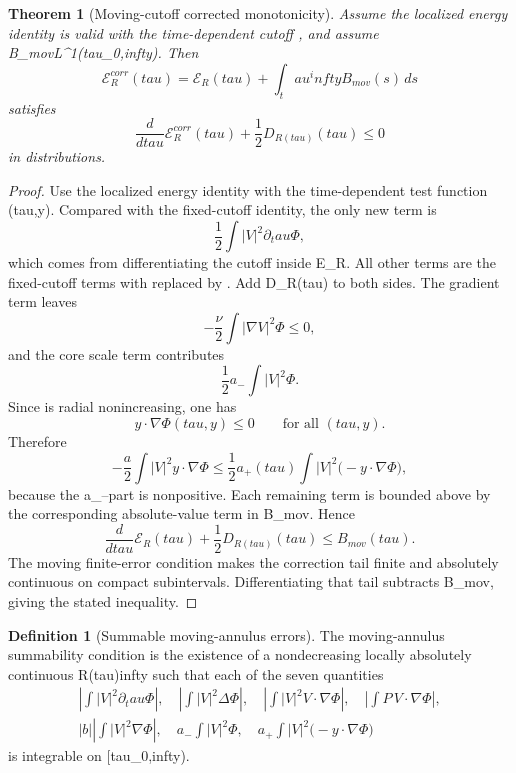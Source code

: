 \documentclass[11pt]{amsart}
\def\({}%
\def\){}%
\def\tilde#1{#1}%
\def\mathfrak#1{#1}%
\def\mathrm#1{#1}%
\def\tau{tau}%
\def\infty{infty}%
\theoremstyle{plain}
\newtheorem{theorem}{Theorem}[section]
\theoremstyle{definition}
\newtheorem{definition}[definition]{Definition}
\theoremstyle{remark}
\begin{document}
\begin{theorem}[Moving-cutoff corrected monotonicity]
\label{paper6a:thm:moving-corrected-monotonicity}
Assume the localized energy identity is valid with the time-dependent cutoff
\(\Phi\), and assume \(B_{\mathrm{mov}}\in L^1(\tau_0,\infty)\).  Then
\[
  \mathcal E_R^{\mathrm{corr}}(\tau)
  =
  \mathcal E_R(\tau)+\int_\tau^\infty B_{\mathrm{mov}}(s)\,ds
\]
satisfies
\[
  \frac{d}{d\tau}\mathcal E_R^{\mathrm{corr}}(\tau)
  +\frac12\tilde{\mathfrak D}_{R(\tau)}(\tau)\le0
\]
in distributions.
\end{theorem}

\begin{proof}
Use the localized energy identity with the time-dependent test function
\(\Phi(\tau,y)\).  Compared with the fixed-cutoff identity, the only new term
is
\[
  \frac12\int |V|^2\partial_\tau\Phi,
\]
which comes from differentiating the cutoff inside \(\mathcal E_R\).  All
other terms are the fixed-cutoff terms with \(\phi\) replaced by \(\Phi\).  Add
\(\tilde{\mathfrak D}_{R(\tau)}\) to both sides.  The gradient term
leaves
\[
  -\frac{\nu}{2}\int|\nabla V|^2\Phi\le0,
\]
and the core scale term contributes
\[
  \frac12a_-\int |V|^2\Phi .
\]
Since \(\phi\) is radial nonincreasing, one has
\[
  y\cdot\nabla\Phi(\tau,y)\le0
  \qquad\text{for all }(\tau,y).
\]
Therefore
\[
  -\frac{a}{2}\int |V|^2y\cdot\nabla\Phi
  \le
  \frac12a_+(\tau)\int |V|^2\bigl(-y\cdot\nabla\Phi\bigr),
\]
because the \(a_-\)-part is nonpositive.  Each remaining term is bounded above
by the corresponding absolute-value term in \(B_{\mathrm{mov}}\).  Hence
\[
  \frac{d}{d\tau}\mathcal E_R(\tau)
  +\frac12\tilde{\mathfrak D}_{R(\tau)}(\tau)
  \le B_{\mathrm{mov}}(\tau).
\]
The moving finite-error condition makes the correction tail finite and
absolutely continuous on compact subintervals.  Differentiating that tail
subtracts \(B_{\mathrm{mov}}\), giving the stated inequality.
\end{proof}

\begin{definition}[Summable moving-annulus errors]\label{paper6a:def:summable-moving-errors}
The moving-annulus summability condition is the existence of a nondecreasing
locally absolutely continuous \(R(\tau)\to\infty\) such that each of the seven
quantities
\[
\begin{gathered}
  \left|\int |V|^2\partial_\tau\Phi\right|,\quad
  \left|\int |V|^2\Delta\Phi\right|,\quad
  \left|\int |V|^2V\cdot\nabla\Phi\right|,\quad
  \left|\int P\,V\cdot\nabla\Phi\right|,\\
  |b|\left|\int |V|^2\nabla\Phi\right|,\quad
  a_-\int |V|^2\Phi,\quad
  a_+\int |V|^2\bigl(-y\cdot\nabla\Phi\bigr)
\end{gathered}
\]
is integrable on \([\tau_0,\infty)\).
\end{definition}
\end{document}
